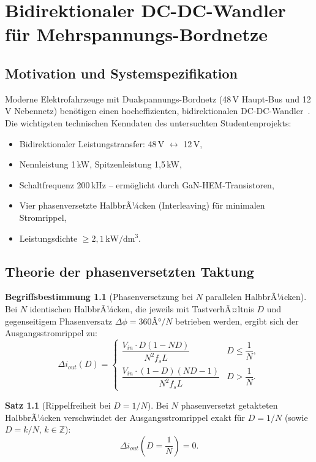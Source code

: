 ﻿\documentclass[a4paper,12pt,openany,oneside]{book}
\newcommand{\abschnitt}[1]{\section{#1}}
\theoremstyle{definition}
\newtheorem{definition}{Begriffsbestimmung}[chapter]
\newtheorem{satz}{Satz}[chapter]
\begin{document}
\chapter{Bidirektionaler DC-DC-Wandler f\"ur Mehrspannungs-Bordnetze}
\label{kap:bidi_dcdc}

\abschnitt{Motivation und Systemspezifikation}

Moderne Elektrofahrzeuge mit Dualspannungs-Bordnetz (48\,V Haupt-Bus und 12\,V
Nebennetz) ben\"otigen einen hocheffizienten, bidirektionalen DC-DC-Wandler~\cite{Keuck2021}.
Die wichtigsten technischen Kenndaten des untersuchten Studentenprojekts:
\begin{itemize}
  \item Bidirektionaler Leistungstransfer: 48\,V $\leftrightarrow$ 12\,V,
  \item Nennleistung 1\,kW, Spitzenleistung 1{,}5\,kW,
  \item Schaltfrequenz 200\,kHz -- erm\"oglicht durch GaN-HEM-Transistoren,
  \item Vier phasenversetzte HalbbrÃ¼cken (Interleaving) f\"ur minimalen Stromrippel,
  \item Leistungsdichte $\geq 2{,}1\,\mathrm{kW/dm^3}$.
\end{itemize}

\abschnitt{Theorie der phasenversetzten Taktung}

\begin{definition}[Phasenversetzung bei $N$ parallelen HalbbrÃ¼cken]
  Bei $N$ identischen HalbbrÃ¼cken, die jeweils mit TastverhÃ¤ltnis $D$ und
  gegenseitigem Phasenversatz $\Delta\phi = 360Â°/N$ betrieben werden, ergibt sich
  der Ausgangsstromrippel zu:
  \[
    \Delta i_{out}(D) =
    \begin{cases}
      \dfrac{V_{in} \cdot D (1 - ND)}{N^2 f_s L} & D \leq \dfrac{1}{N}, \\[6pt]
      \dfrac{V_{in} \cdot (1-D)(ND-1)}{N^2 f_s L} & D > \dfrac{1}{N}.
    \end{cases}
  \]
\end{definition}

\begin{satz}[Rippelfreiheit bei $D = 1/N$]
  Bei $N$ phasenversetzt getakteten HalbbrÃ¼cken verschwindet der Ausgangsstromrippel
  exakt f\"ur $D = 1/N$ (sowie $D = k/N$, $k \in \mathbb{Z}$):
  \[
    \Delta i_{out}\!\left(D = \frac{1}{N}\right) = 0.
  \]
\end{satz}
\end{document}
